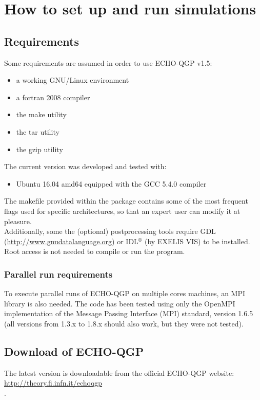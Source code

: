 \chapter{How to set up and run simulations}
\section{Requirements}
Some requirements are assumed in order to use ECHO-QGP v1.5:
\begin{itemize}
 \item a working GNU/Linux environment
 \item a fortran 2008 compiler
 \item the make utility
 \item the tar utility
 \item the gzip utility
\end{itemize}
The current version was developed and tested with:
\begin{itemize}
 \item  Ubuntu 16.04 amd64 equipped with the GCC 5.4.0 compiler 
\end{itemize}
The makefile provided within the package contains some of the most frequent flags used for specific 
architectures, so that an expert user can modify it at pleasure.\\

Additionally, some the (optional) postprocessing tools require GDL (\url{http://www.gnudatalanguage.org}) or IDL$^\circledR$ (by EXELIS VIS) to be installed. \\

Root access is not needed to compile or run the program.\\

\subsection{Parallel run requirements}
To execute parallel runs of ECHO-QGP on multiple cores machines, an MPI library is also needed. The code has been tested using only the OpenMPI implementation of the Message Passing Interface (MPI) standard, version 1.6.5 (all versions from 1.3.x to 1.8.x should also work, but they were not tested).\\

\section{Download of ECHO-QGP}
The latest version is downloadable from the official ECHO-QGP website: 
\url{http://theory.fi.infn.it/echoqgp}\\.

